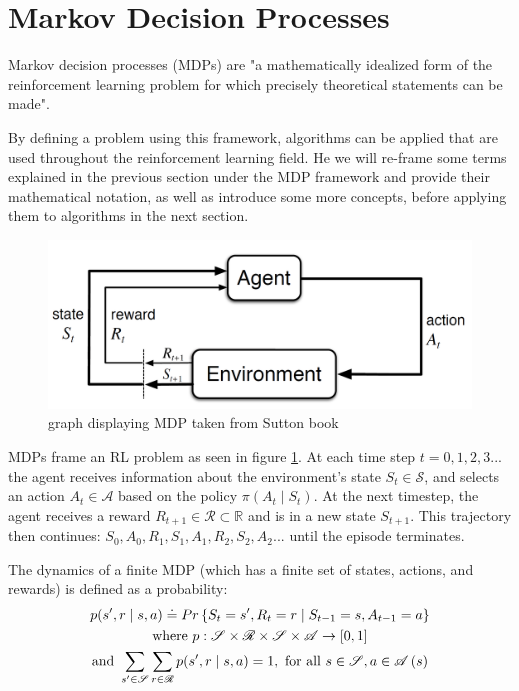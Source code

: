 \section{Markov Decision Processes}\label{MDP}
Markov decision processes (MDPs) are "a mathematically idealized form of the reinforcement learning problem for which precisely theoretical statements can be made".

By defining a problem using this framework, algorithms can be applied that are used throughout the reinforcement learning field. He we will re-frame some terms explained in the previous section under the MDP framework and provide their mathematical notation, as well as introduce some more concepts, before applying them to algorithms in the next section.

\begin{figure}[h]
\includegraphics[width=\textwidth]{images/mdp}
\caption[Markov Decision Process]{graph displaying MDP taken from Sutton book}
\label{fig:mdp}
\end{figure}

MDPs frame an RL problem as seen in figure \ref{fig:mdp}. At each time step $t = 0\mathrm{,}1\mathrm{,}2\mathrm{,}3\mathrm{...}$ the agent receives information about the environment's state $S_{t}\in\mathscr{S}$, and selects an action $A_{t}\in\mathscr{A}$ based on the policy $\pi\left(A_t\mid S_t\right)$. At the next timestep, the agent receives a reward $R_{t+1}\in\mathscr{R}\subset\mathbb{R}$ and is in a new state $S_{t+1}$. This trajectory then continues: $S_0,A_0,R_1,S_1,A_1,R_2,S_2,A_2...$ until the episode terminates. 

The dynamics of a finite MDP (which has a finite set of states, actions, and rewards) is defined as a probability:
\begin{gather}
p(s',r\mid s,a) \doteq Pr\left\lbrace S_t=s',R_t=r \mid S_{t-1} = s, A_{t-1}=a\right\rbrace \\
\textnormal{where } p:\mathscr{S}\times\mathscr{R}\times\mathscr{S}\times\mathscr{A}\to\left[0,1\right] \nonumber \\
\textnormal{and } \sum_{s'\in\mathscr{S}}\sum_{r\in\mathscr{R}}p(s',r\mid s,a)=1, \textnormal{ for all }  s\in\mathscr{S},a\in\mathscr{A}\left(s\right) \nonumber
\end{gather}

